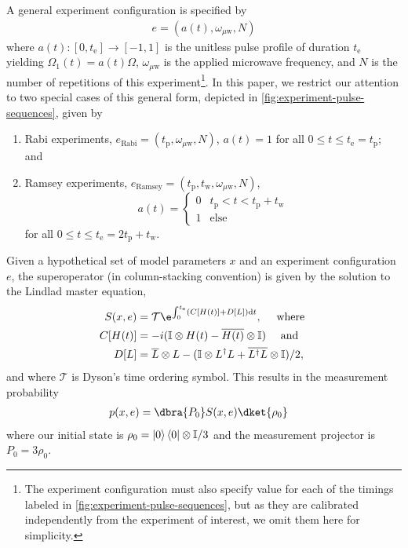 \documentclass[aps,nofootinbib,twocolumn,superscriptaddress]{revtex4}
\newcommand{\mps}{x}
\newcommand{\eps}{e}
\newcommand{\Rabi}{\text{Rabi}}
\newcommand{\Ramsey}{\text{Ramsey}}
\newcommand{\te}{t_\text{e}}
\newcommand{\tp}{t_\text{p}}
\newcommand{\tw}{t_\text{w}}
\renewcommand{\H}{H}    %
\renewcommand{\L}{L}    %
\renewcommand{\S}{S}    %
\newcommand{\uw}{{\mu\text{w}}}
\begin{document}
A general experiment configuration is specified by
\begin{align}
    \eps=(a(t), \omega_\uw, N)
\end{align}
where $a(t):[0,\te]\rightarrow [-1,1]$ is the 
unitless pulse profile of duration $\te$ 
yielding $\Omega_1(t)=a(t)\Omega$,
$\omega_\uw$ is the applied microwave frequency,
and $N$ is the number of repetitions of this experiment\footnote{The
experiment configuration must also specify value for each of the timings
labeled in \autoref{fig:experiment-pulse-sequences}, but as they are
calibrated independently from the experiment of interest, we omit
them here for simplicity.}.
In this paper, we restrict our attention to two special
cases of this general form, depicted in 
\autoref{fig:experiment-pulse-sequences}, given by
\begin{enumerate}
    \item Rabi experiments, $\eps_\Rabi=(\tp,\omega_\uw, N)$, 
    $a(t)=1$ for all $0\leq t\leq \te=\tp$; and
    \item Ramsey experiments, $\eps_\Ramsey=(\tp,\tw,\omega_\uw, N)$, 
    \begin{equation*}
        a(t)=\begin{cases}
            0 & \tp<t<\tp+\tw\\
            1 & \text{else}
        \end{cases}
    \end{equation*}
    for all $0\leq t\leq \te=2\tp+\tw$.
\end{enumerate}

Given a hypothetical set of model parameters $\mps$ and 
an experiment configuration $\eps$, the superoperator
(in column-stacking convention) is given by the solution
to the Lindlad master equation,
\begin{subequations}
\begin{align}
    S(\mps,\eps)
        &=\mathcal{T}\e^{\int_0^{\te}(C[\H(t)]+D[\L])\dd t}, 
        \quad\text{ where } \\
    C[\H(t)]
        &=-i(\I\otimes\H(t)-\overline{\H(t)}\otimes\I) 
        \quad\text{ and } \\
    D[L] 
        &= \overline{L}\otimes L
            -(\I\otimes L^\dagger L + \overline{L^\dagger L}\otimes \I) / 2,
\end{align}
\end{subequations}
and where $\mathcal{T}$ is Dyson's time ordering symbol.
This results in the measurement probability
\begin{align}
    p(\mps,\eps)
        &=  \dbra{P_0} \S(\mps,\eps)\dket{\rho_0}
    \label{eq:born-rule}
\end{align}
where our initial state is $\rho_0=\ket{0}\bra{0}\otimes\mathbb{I}/3$
and the measurement projector is $P_0=3\rho_0$.
\end{document}
